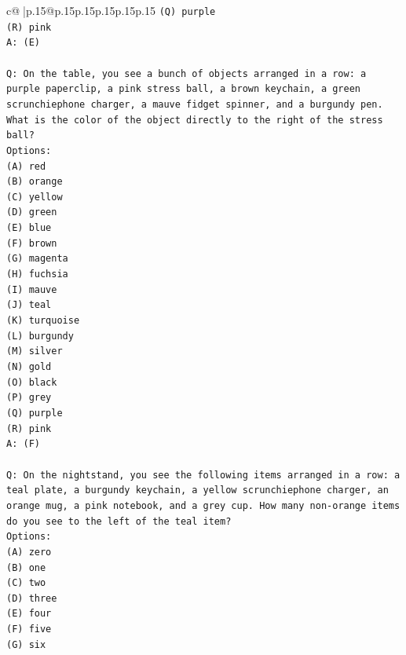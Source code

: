 \documentclass{article}
\begin{document}
{\begin{supertabular}{c@{$\;$}|p{.15\linewidth}@{}p{.15\linewidth}p{.15\linewidth}p{.15\linewidth}p{.15\linewidth}p{.15\linewidth}}
{{{\texttt{(Q) purple} \\
\texttt{(R) pink} \\
\texttt{A: (E)} \\
\\ 
\texttt{Q: On the table, you see a bunch of objects arranged in a row: a purple paperclip, a pink stress ball, a brown keychain, a green scrunchiephone charger, a mauve fidget spinner, and a burgundy pen. What is the color of the object directly to the right of the stress ball?} \\
\texttt{Options:} \\
\texttt{(A) red} \\
\texttt{(B) orange} \\
\texttt{(C) yellow} \\
\texttt{(D) green} \\
\texttt{(E) blue} \\
\texttt{(F) brown} \\
\texttt{(G) magenta} \\
\texttt{(H) fuchsia} \\
\texttt{(I) mauve} \\
\texttt{(J) teal} \\
\texttt{(K) turquoise} \\
\texttt{(L) burgundy} \\
\texttt{(M) silver} \\
\texttt{(N) gold} \\
\texttt{(O) black} \\
\texttt{(P) grey} \\
\texttt{(Q) purple} \\
\texttt{(R) pink} \\
\texttt{A: (F)} \\
\\ 
\texttt{Q: On the nightstand, you see the following items arranged in a row: a teal plate, a burgundy keychain, a yellow scrunchiephone charger, an orange mug, a pink notebook, and a grey cup. How many non{-}orange items do you see to the left of the teal item?} \\
\texttt{Options:} \\
\texttt{(A) zero} \\
\texttt{(B) one} \\
\texttt{(C) two} \\
\texttt{(D) three} \\
\texttt{(E) four} \\
\texttt{(F) five} \\
\texttt{(G) six} \\
}}}
\end{supertabular}}
\end{document}

